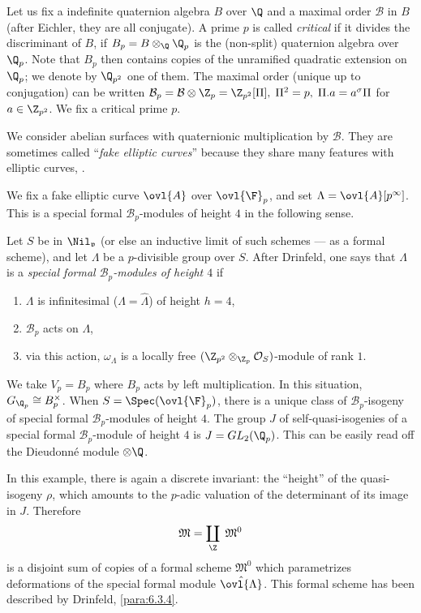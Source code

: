 \begin{exa}\label{exa:4.3.4}
 Let us fix a indefinite quaternion algebra $B$
 over $\Q$ and a maximal order $\mathcal{B}$ in $B$ (after Eichler, they
 are all conjugate). A prime $p$ is called {\it critical} if it divides
 the discriminant of $B$, \ie if $B_p=B\otimes_\Q \Q_p$ is the
 (non-split) quaternion algebra over $\Q_p$. Note that $B_p$ then
 contains copies of the unramified quadratic extension on $\Q_p$; we
 denote by $\Q_{p^2}$ one of them. The maximal order (unique up to
 conjugation) can be written $\mathcal{B}_p=\mathcal{B}\otimes
 \Z_p=\Z_{p^2}[\Pi],\;\Pi^2=p,\;\Pi.a=a^\sigma\Pi$ for $a\in
 \Z_{p^2}$. We fix a critical prime $p$.


 We consider abelian surfaces with quaternionic multiplication by
 $\mathcal{B}$. They are sometimes called ``{\it fake elliptic curves}''
 because they share many features with elliptic curves, 
 \cf \cite[III, 1]{updcds}.

 We fix a fake elliptic curve $\ovl{A}$ over $\ovl{\F}_p$, and set
 $\Lambda=\ovl{A}[p^\infty]$. This is a special formal
 $\mathcal{B}_p$-modules of height $4$ in the following sense.

 Let $S$ be in $\Nil_\mathfrak{v}$ (or else an inductive limit of such
 schemes --- as a formal scheme), and let $\Lambda$ be a $p$-divisible
 group over $S$. After Drinfeld, one says that $\Lambda$ is a {\it
 special formal $\mathcal{B}_p$-modules of height $4$} if

\begin{enumerate}
 \item $\Lambda$ is infinitesimal ($\Lambda=\hat\Lambda$) of height
       $h=4$,
 \item $\mathcal{B}_p$ acts on $\Lambda$,
 \item via this action, $\omega_\Lambda$ is a locally free
       $(\Z_{p^2}\otimes_{\Z_p}\mathcal{O}_S)$-module of rank $1$.
\end{enumerate}

\noindent We take $V_p=B_p$ where $B_p$ acts by left
multiplication. In this situation, $G_{\Q_p}\cong B_p^\times $. When
$S=\Spec(\ovl{\F}_p)$, there is a unique class of
$\mathcal{B}_p$-isogeny of special formal $\mathcal{B}_p$-modules of
height $4$. The group $J$ of self-quasi-isogenies of a special formal
$\mathcal{B}_p$-module of height $4$ is $J=GL_2(\Q_p)$. This can be
easily read off the Dieudonn\'e module $\otimes\Q$.


In this example, there is again a discrete invariant: the ``height'' of 
the quasi-isogeny $\rho$, which amounts to the 
$p$-adic valuation of the determinant of its image in $J$.
Therefore 
 \begin{equation*}
 \mathfrak{M}=\coprod_{\Z}\;\mathfrak{M}^0
\end{equation*}
 is a disjoint sum of copies of a formal scheme $\mathfrak{M}^0$
 which parametrizes deformations of the special formal module
 $\hat{\ovl{\Lambda}}$. This formal scheme has been described by
 Drinfeld, \cf \ref{para:6.3.4}.
\end{exa}

